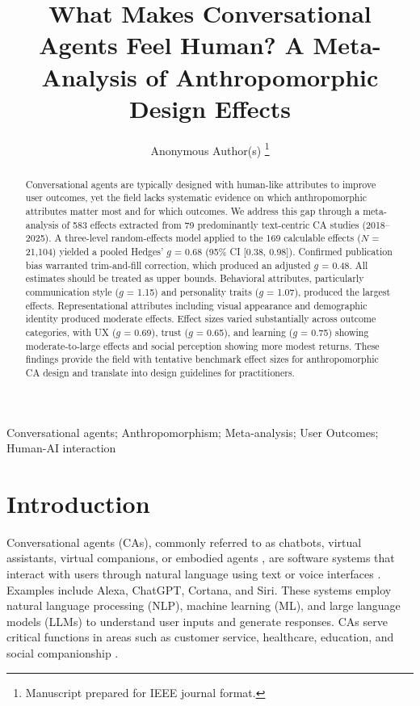 \documentclass[lettersize,journal]{IEEEtran}
\begin{document}
\title{What Makes Conversational Agents Feel Human? A Meta-Analysis of Anthropomorphic Design Effects}

\author{Anonymous Author(s)%
\thanks{Manuscript prepared for IEEE journal format.}}


\maketitle

\begin{abstract}
Conversational agents are typically designed with human-like attributes to improve user outcomes, yet the field lacks systematic evidence on which anthropomorphic attributes matter most and for which outcomes. We address this gap through a meta-analysis of 583 effects extracted from 79 predominantly text-centric CA studies (2018--2025). A three-level random-effects model applied to the 169 calculable effects ($N$ = 21,104) yielded a pooled Hedges' $g$ = 0.68 (95\% CI [0.38, 0.98]). Confirmed publication bias warranted trim-and-fill correction, which produced an adjusted $g$ = 0.48. All estimates should be treated as upper bounds. Behavioral attributes, particularly communication style ($g$ = 1.15) and personality traits ($g$ = 1.07), produced the largest effects. Representational attributes including visual appearance and demographic identity produced moderate effects. Effect sizes varied substantially across outcome categories, with UX ($g$ = 0.69), trust ($g$ = 0.65), and learning ($g$ = 0.75) showing moderate-to-large effects and social perception showing more modest returns. These findings provide the field with tentative benchmark effect sizes for anthropomorphic CA design and translate into design guidelines for practitioners.
\end{abstract}

\begin{IEEEkeywords}
Conversational agents; Anthropomorphism; Meta-analysis; User Outcomes; Human-AI interaction
\end{IEEEkeywords}

\section{Introduction}
\label{sec:introduction}

Conversational agents (CAs), commonly referred to as chatbots, virtual assistants, virtual companions, or embodied agents \cite{klein_effects_2025}, are software systems that interact with users through natural language using text or voice interfaces \cite{diederich_conversational_2019}. Examples include Alexa, ChatGPT, Cortana, and Siri. These systems employ natural language processing (NLP), machine learning (ML), and large language models (LLMs) to understand user inputs and generate responses. CAs serve critical functions in areas such as customer service, healthcare, education, and social companionship \cite{araujo2018living,brandtzaeg2017people}.
\end{document}
